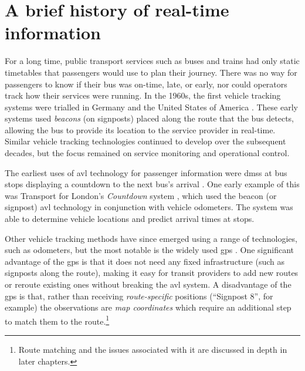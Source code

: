 \section{A brief history of real-time information}
\label{sec:literature}

For a long time, public transport services such as buses and trains had only static timetables that passengers would use to plan their journey. There was no way for passengers to know if their bus was on-time, late, or early, nor could operators track how their services were running. In the 1960s, the first vehicle tracking systems were trialled in Germany and the United States of America \citep{TCRP_1997}. These early systems used \emph{beacons} (on signposts) placed along the route that the bus detects, allowing the bus to provide its location to the service provider in real-time. Similar vehicle tracking technologies continued to develop over the subsequent decades, but the focus remained on service monitoring and operational control.


The earliest uses of \gls{avl} technology for passenger information were \glspl{dms} at bus stops displaying a countdown to the next bus's arrival \citep{TCRP_2003}. One early example of this was Transport for London's \emph{Countdown} system \citep{Balogh_1993}, which used the beacon (or signpost) \gls{avl} technology in conjunction with vehicle odometers. The system was able to determine vehicle locations and predict arrival times at stops.


Other vehicle tracking methods have since emerged using a range of technologies, such as odometers, but the most notable is the widely used \gls{gps} \citep{Zhao_1997}. One significant advantage of the \gls{gps} is that it does not need any fixed infrastructure (such as signposts along the route), making it easy for transit providers to add new routes or reroute existing ones without breaking the \gls{avl} system. A disadvantage of the \gls{gps} is that, rather than receiving \emph{route-specific} positions (``Signpost 8'', for example) the observations are \emph{map coordinates} which require an additional step to match them to the route.\footnote{Route matching and the issues associated with it are discussed in depth in later chapters.}


